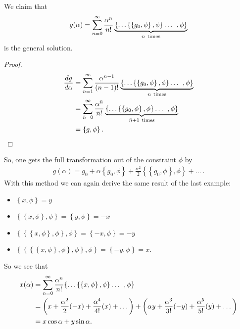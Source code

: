 We claim that 
\begin{align}
g(\alpha) = \sum_{n=0}^{\infty} \frac{\alpha^n}{n !} \underbrace{\Large \{ \dots \left \{ \left \{ g_0 , \phi \right \} , \phi \right \} \dots \ , \phi \Large \}}_{n \ \text{times}}
\end{align}
is the general solution.
\begin{proof}
\begin{align}
\frac{d g}{d \alpha} &= \sum_{n=1}^{\infty} \frac{\alpha^{n-1}}{(n-1) !} \underbrace{\Large \{ \dots \left \{ \left \{ g_0 , \phi \right \} , \phi \right \} \dots \ , \phi \Large \}}_{n \ \text{times}} \notag \\
&= \sum_{\bar{n}=0}^{\infty} \frac{\alpha^{\bar{n}}}{\bar{n} !} \underbrace{\Large \{ \dots \left \{ \left \{ g_0 , \phi \right \} , \phi \right \} \dots \ , \phi \Large \}}_{\bar{n} + 1 \ \text{times}} \notag \\
&= \left \{ g , \phi \right \}.
\end{align}
\end{proof}
So, one gets the full transformation out of the constraint $\phi$ by 
\begin{align}\label{eq:11}
g(\alpha) = g_0 + \alpha \left\{ g_0 , \phi \right \} + \frac{\alpha^2}{2} \left \{ \left \{ g_0 , \phi \right \} , \phi \right \} + \dots \ .
\end{align}
With this method we can again derive the same result of the last example:
\begin{itemize}
\item $\left\{ x , \phi \right \} = y$
\item $\left \{ \left\{ x , \phi \right \} , \phi \right \} = \left\{ y , \phi \right \} = - x$
\item $\left \{ \left \{ \left\{ x , \phi \right \} , \phi \right \} , \phi \right \} = \left\{ -x , \phi \right \} = - y$
\item $\left \{ \left \{ \left \{ \left\{ x , \phi \right \} , \phi \right \}, \phi \right \}, \phi \right \} = \left\{ -y , \phi \right \} = x$.
\end{itemize}
So we see that
\begin{align}
x(\alpha) &= \sum_{n=0}^{\infty} \frac{\alpha^n}{n !} \Large \{ \dots \left \{ \left \{ x , \phi \right \} , \phi \right \} \dots \ , \phi \Large \} \notag \\
&= \left( x + \frac{\alpha^2}{2} (-x) + \frac{\alpha^4}{4 !} (x) + \dots \right) + \left( \alpha y + \frac{\alpha^3}{3 !} (-y) + \frac{\alpha^5}{5 !} (y) + \dots \right) \notag \\
&= x \cos \alpha + y \sin \alpha.
\end{align}



